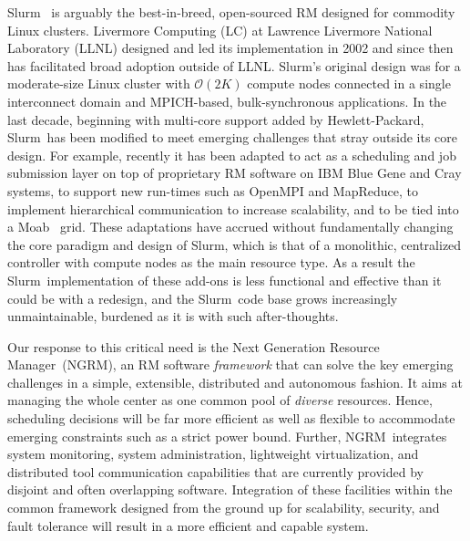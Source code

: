 \documentclass[10pt]{article}
\newif\ifcomments
\newcommand{\ngrm}{NGRM}
\newcommand{\ngrmfull}{Next Generation Resource Manager}
\newcommand{\slurm}{Slurm}
\newcommand{\moab}{Moab}
\DeclareRobustCommand{\orderof}{\ensuremath{\mathcal{O}}}
\begin{document}
\ifcomments
\marginpar{\tiny {\bf ned-review:} Citation needed.
As above, we need more than anecdotal evidence that Slurm can't meet future
requirements.}
\fi
\slurm~\cite{SlurmDesign} is arguably the
best-in-breed, open-sourced RM designed for commodity Linux clusters.
Livermore Computing (LC) at Lawrence Livermore National Laboratory (LLNL)
designed and led its implementation in 2002 and since then has facilitated
broad adoption outside of LLNL.
\slurm's original design was for a moderate-size Linux cluster with
$\orderof\left(2K\right)$
compute nodes connected in a single interconnect domain and MPICH-based, 
bulk-synchronous applications.
In the last decade, beginning with multi-core support added by
Hewlett-Packard\cite{DBLP:conf/jsspp/BalleP07},
\slurm\ has been modified to meet emerging challenges
that stray outside its core design.
For example, recently
it has been adapted to act as a scheduling and job submission layer
on top of proprietary RM software on IBM Blue Gene and Cray systems,
to support new run-times such as OpenMPI and MapReduce\cite{SlurmMR},
to implement hierarchical communication to increase scalability,
and to be tied into a \moab~\cite{MOAB:online} grid.
These adaptations have accrued without fundamentally changing the
core paradigm and design of \slurm, which is that of a monolithic, centralized
controller with compute nodes as the main resource type.
As a result the \slurm\ implementation of these add-ons is less functional
and effective than it could be with a redesign,
and the \slurm\ code base grows increasingly unmaintainable, burdened
as it is with such after-thoughts.

Our response to this critical need is the \ngrmfull\ (\ngrm ), an RM software
{\em framework} that can solve the key emerging challenges 
in a simple, extensible, distributed and autonomous fashion.
It aims at managing the whole center as one common pool of {\em diverse} 
resources. Hence, scheduling decisions will be 
far more efficient as well as flexible to accommodate 
emerging constraints such as a strict power bound. 
Further, \ngrm\ integrates
system monitoring, system administration, lightweight
virtualization, and distributed tool communication capabilities
that are currently provided by disjoint and often overlapping software.
Integration of these facilities within the common framework designed from
the ground up for scalability, security, and fault tolerance will result
in a more efficient and capable system.
\end{document}
